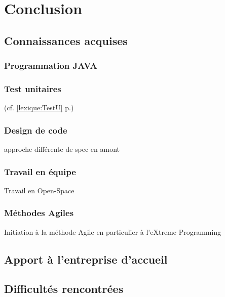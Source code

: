 \chapter{Conclusion}
\section{Connaissances acquises}

\subsection{Programmation JAVA}
\subsection{Test unitaires}
(cf. \ref{lexique:TestU} p.\pageref{lexique:testU})
\subsection{Design de code}
approche différente de spec en amont
\subsection{Travail en équipe}
Travail en Open-Space
\subsection{Méthodes Agiles}
Initiation à la méthode Agile en particulier à l'eXtreme Programming

\section{Apport à l'entreprise d'accueil}

\section{Difficultés rencontrées}

